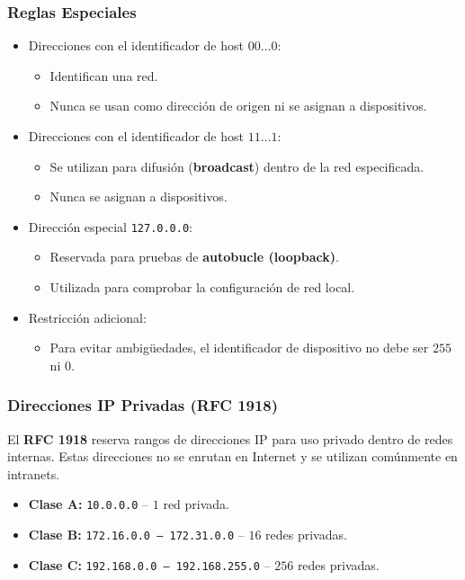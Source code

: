 \documentclass[a4paper,12pt]{article}
\begin{document}
\subsubsection*{Reglas Especiales}
\begin{itemize}
    \item Direcciones con el identificador de host \(00\ldots0\): 
    \begin{itemize}
        \item Identifican una red.
        \item Nunca se usan como dirección de origen ni se asignan a dispositivos.
    \end{itemize}
    
    \item Direcciones con el identificador de host \(11\ldots1\):
    \begin{itemize}
        \item Se utilizan para difusión (\textbf{broadcast}) dentro de la red especificada.
        \item Nunca se asignan a dispositivos.
    \end{itemize}

    \item Dirección especial \texttt{127.0.0.0}:
    \begin{itemize}
        \item Reservada para pruebas de \textbf{autobucle (loopback)}.
        \item Utilizada para comprobar la configuración de red local.
    \end{itemize}
    
    \item Restricción adicional:
    \begin{itemize}
        \item Para evitar ambigüedades, el identificador de dispositivo no debe ser \(255\) ni \(0\).
    \end{itemize}
\end{itemize}

\subsubsection*{Direcciones IP Privadas (RFC 1918)}
El \textbf{RFC 1918} reserva rangos de direcciones IP para uso privado dentro de redes internas. Estas direcciones no se enrutan en Internet y se utilizan comúnmente en intranets.
\begin{itemize}
    \item \textbf{Clase A:} \texttt{10.0.0.0} – \(1\) red privada.
    \item \textbf{Clase B:} \texttt{172.16.0.0 – 172.31.0.0} – \(16\) redes privadas.
    \item \textbf{Clase C:} \texttt{192.168.0.0 – 192.168.255.0} – \(256\) redes privadas.
\end{itemize}
\end{document}
